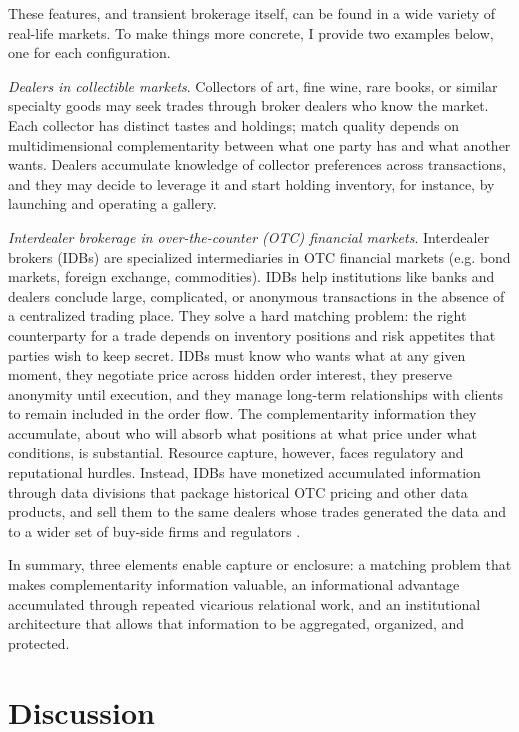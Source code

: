 \documentclass[
]{article}
\begin{document}
These features, and transient brokerage itself, can be found in a wide variety of real-life markets. To make things more concrete, I provide two examples below, one for each configuration.

\emph{Dealers in collectible markets}. Collectors of art, fine wine, rare books, or similar specialty goods may seek trades through broker dealers who know the market. Each collector has distinct tastes and holdings; match quality depends on multidimensional complementarity between what one party has and what another wants. Dealers accumulate knowledge of collector preferences across transactions, and they may decide to leverage it and start holding inventory, for instance, by launching and operating a gallery.

\emph{Interdealer brokerage in over-the-counter (OTC) financial markets}. Interdealer brokers (IDBs) are specialized intermediaries in OTC financial markets (e.g. bond markets, foreign exchange, commodities). IDBs help institutions like banks and dealers conclude large, complicated, or anonymous transactions in the absence of a centralized trading place. They solve a hard matching problem: the right counterparty for a trade depends on inventory positions and risk appetites that parties wish to keep secret. IDBs must know who wants what at any given moment, they negotiate price across hidden order interest, they preserve anonymity until execution, and they manage long-term relationships with clients to remain included in the order flow. The complementarity information they accumulate, about who will absorb what positions at what price under what conditions, is substantial. Resource capture, however, faces regulatory and reputational hurdles. Instead, IDBs have monetized accumulated information through data divisions that package historical OTC pricing and other data products, and sell them to the same dealers whose trades generated the data and to a wider set of buy-side firms and regulators \autocites[see e.g.][]{CapitalMarketsIndicative,ARA_FullReport}.

In summary, three elements enable capture or enclosure: a matching problem that makes complementarity information valuable, an informational advantage accumulated through repeated vicarious relational work, and an institutional architecture that allows that information to be aggregated, organized, and protected.

\section{Discussion}
\end{document}
